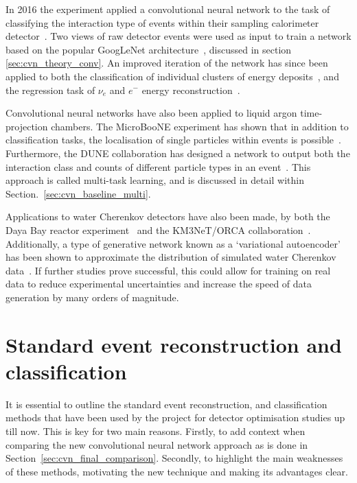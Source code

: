 In 2016 the \nova experiment applied a convolutional neural network to the task of classifying the
interaction type of events within their sampling calorimeter detector~\cite{aurisano2016}. Two
views of raw detector events were used as input to train a network based on the popular GoogLeNet
architecture~\cite{szegedy2015}, discussed in section \ref{sec:cvn_theory_conv}. An
improved iteration of the network has since been applied to both the classification of individual
clusters of energy deposits~\cite{psihas2019}, and the regression task of $\nu_{e}$ and $e^{-}$
energy reconstruction~\cite{baldi2019}.

Convolutional neural networks have also been applied to liquid argon time-projection chambers. The
MicroBooNE experiment has shown that in addition to classification tasks, the localisation of
single particles within events is possible~\cite{acciarri2017}. Furthermore, the DUNE
collaboration has designed a network to output both the interaction class and counts of different
particle types in an event~\cite{collaboration2020, abi2020}. This approach is called multi-task
learning, and is discussed in detail within Section.~\ref{sec:cvn_baseline_multi}.

Applications to water Cherenkov detectors have also been made, by both the Daya Bay reactor
experiment~\cite{racah2016} and the KM3NeT/ORCA collaboration~\cite{aiello2020}. Additionally, a
type of generative network known as a `variational autoencoder' has been shown to approximate the
distribution of simulated water Cherenkov data~\cite{abhishek2019}. If further studies prove
successful, this could allow for training on real data to reduce experimental uncertainties and
increase the speed of data generation by many orders of magnitude.

\section{Standard event reconstruction and classification} %
\label{sec:cvn_old} %

It is essential to outline the standard event reconstruction, and classification methods that have
been used by the \chips project for detector optimisation studies up till now. This is key for two
main reasons. Firstly, to add context when comparing the new convolutional neural network approach
as is done in Section~\ref{sec:cvn_final_comparison}. Secondly, to highlight the main weaknesses
of these methods, motivating the new technique and making its advantages clear.

